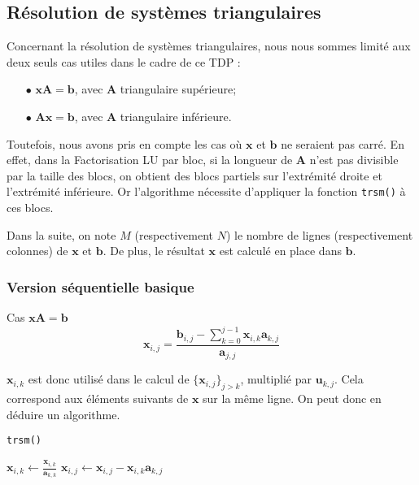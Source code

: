 \subsection{Résolution de systèmes triangulaires}

Concernant la résolution de systèmes triangulaires, nous nous sommes limité aux deux seuls cas utiles dans le cadre de ce TDP :
\begin{itemize}
\item[$\bullet$]$\mathbf{xA=b}$, avec $\mathbf{A}$ triangulaire supérieure;
\item[$\bullet$]$\mathbf{Ax=b}$, avec $\mathbf{A}$ triangulaire inférieure.
\end{itemize}
Toutefois, nous avons pris en compte les cas où $\mathbf{x}$ et $\mathbf{b}$ ne seraient pas carré. En effet, dans la Factorisation LU par bloc, si la longueur de $\mathbf{A}$ n'est pas divisible par la taille des blocs, on obtient des blocs partiels sur l'extrémité droite et l'extrémité inférieure. Or l'algorithme nécessite d'appliquer la fonction \texttt{trsm()} à ces blocs.

Dans la suite, on note $M$ (respectivement $N$) le nombre de lignes (respectivement colonnes) de $\mathbf{x}$ et $\mathbf{b}$. De plus, le résultat $\mathbf{x}$ est calculé en place dans $\mathbf{b}$.

\subsubsection{Version séquentielle basique}

\large Cas $\mathbf{xA=b}$\\

\begin{equation*}
\mathbf{x}_{i,j} = \frac{\mathbf{b}_{i,j} - \sum\limits_{k=0}^{j-1}\mathbf{x}_{i,k}\mathbf{a}_{k,j}}{\mathbf{a}_{j,j}}
\end{equation*}

$\mathbf{x}_{i,k}$ est donc utilisé dans le calcul de $\{\mathbf{x}_{i,j}\}_{j>k}$, multiplié par $\mathbf{u}_{k,j}$. Cela correspond aux éléments suivants de $\mathbf{x}$ sur la même ligne. On peut donc en déduire un algorithme.

\begin{algorithm}
\caption*{\texttt{trsm()}}
\begin{algorithmic}
            \State$\mathbf{x}_{i,k}\gets\frac{\mathbf{x}_{i,k}}{\mathbf{a}_{k,k}}$
        \EndFor
                \State$\mathbf{x}_{i,j}\gets\mathbf{x}_{i,j}-\mathbf{x}_{i,k}\mathbf{a}_{k,j}$
            \EndFor
        \EndFor
    \EndFor
\end{algorithmic}
\end{algorithm}

